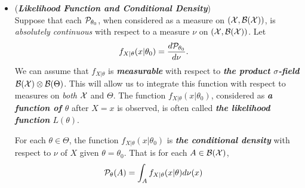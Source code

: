 \documentclass[11pt]{article}
\begin{document}
\begin{itemize}

\item \begin{definition} (\emph{\textbf{Likelihood Function and Conditional Density}})  \citep{schervish2012theory}\\
Suppose that each ${\mathcal P}_{\theta_0}$, when considered as a measure on $({\mathcal X}, {\mathcal B}({\mathcal X}))$, is \textit{absolutely continuous} with respect to a measure $\nu$ on $({\mathcal X}, {\mathcal B}({\mathcal X}))$. Let
\begin{align*}
f_{X|\theta}(x|\theta_0) &= \frac{d{\mathcal P}_{\theta_0}}{d\nu}.
\end{align*}
We can assume that $f_{X|\theta}$ is \emph{\textbf{measurable}} with respect to \emph{\textbf{the product $\sigma$-field}} ${\mathcal B}({\mathcal X}) \otimes {\mathcal B}(\Theta)$. This will allow us to integrate this function with respect to measures on \emph{both} ${\mathcal X}$ and $\Theta$. The function $f_{X|\theta}(x|\theta_0)$, considered as \emph{\textbf{a function of $\theta$}} after $X=x$ is observed, is often called \emph{\textbf{the likelihood function} $L(\theta)$}.

For each $\theta \in \Theta$, the function $f_{X|\theta}(x|\theta_0)$ is \emph{\textbf{the conditional density}} with respect to $\nu$ of $X$ given $\theta = \theta_0$. That is for each $A \in {\mathcal B}({\mathcal X})$, 
\begin{align*}
{\mathcal P}_{\theta}(A) &= \int_{A} f_{X|\theta}(x|\theta) d\nu(x)
\end{align*}
\end{definition}


\end{itemize}
\end{document}
